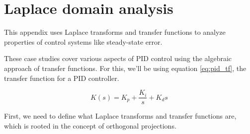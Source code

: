 
\chapter{Laplace domain analysis}
\label{ch:laplace-domain-analysis}

This appendix uses Laplace transforms and transfer functions to analyze
properties of control systems like \gls{steady-state error}.

These case studies cover various aspects of PID control using the algebraic
approach of transfer functions. For this, we'll be using equation
\eqref{eq:pid_tf}, the transfer function for a PID controller.

\begin{equation}
  K(s) = K_p + \frac{K_i}{s} + K_ds \label{eq:pid_tf}
\end{equation}

First, we need to define what Laplace transforms and transfer functions are,
which is rooted in the concept of orthogonal projections.

\renewcommand*{\chapterpath}{\partpath/laplace-domain-analysis}






